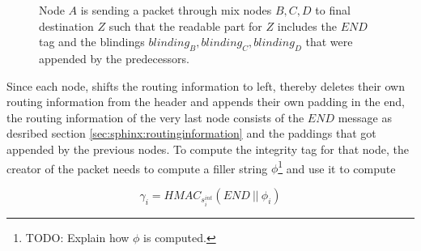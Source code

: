 \begin{figure}[H]
    \caption{Node $A$ is sending a packet through mix nodes $B,C,D$ to final destination $Z$ such that the readable part for $Z$ includes the $END$ tag and the blindings $blinding_B, blinding_C, blinding_D$ that were appended by the predecessors.}
\end{figure}

Since each node, shifts the routing information to left, thereby deletes their own routing information from the header and appends their own padding in the end, the routing information of the very last node consists of the $END$ message as desribed section \ref{sec:sphinx:routinginformation} and the paddings that got appended by the previous nodes. To compute the integrity tag for that node, the creator of the packet needs to compute a filler string $\phi$\footnote{TODO: Explain how $\phi$ is computed.} and use it to compute

$$\gamma_i = HMAC_{s_i^{int}}(END \ || \ \phi_i )$$
